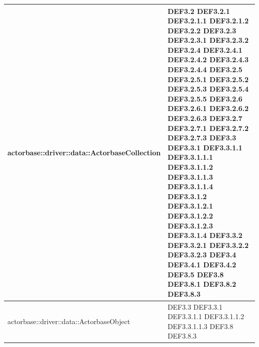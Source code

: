 \documentclass{scalatekids-article}
\begin{document}
\begin{longtable}[H]{|p{12cm}|p{5.5cm}|}
  actorbase::driver::data::ActorbaseCollection & \multiLineCell[t]{DEF3.2 DEF3.2.1\\DEF3.2.1.1 DEF3.2.1.2\\DEF3.2.2 DEF3.2.3\\DEF3.2.3.1 DEF3.2.3.2\\DEF3.2.4 DEF3.2.4.1\\DEF3.2.4.2 DEF3.2.4.3\\DEF3.2.4.4 DEF3.2.5\\DEF3.2.5.1 DEF3.2.5.2\\DEF3.2.5.3 DEF3.2.5.4\\DEF3.2.5.5 DEF3.2.6\\DEF3.2.6.1 DEF3.2.6.2\\DEF3.2.6.3 DEF3.2.7\\DEF3.2.7.1 DEF3.2.7.2\\DEF3.2.7.3 DEF3.3\\DEF3.3.1 DEF3.3.1.1\\DEF3.3.1.1.1 DEF3.3.1.1.2\\DEF3.3.1.1.3 DEF3.3.1.1.4\\DEF3.3.1.2 DEF3.3.1.2.1\\DEF3.3.1.2.2 DEF3.3.1.2.3\\DEF3.3.1.4 DEF3.3.2\\DEF3.3.2.1 DEF3.3.2.2\\DEF3.3.2.3 DEF3.4\\DEF3.4.1 DEF3.4.2\\DEF3.5 DEF3.8\\DEF3.8.1 DEF3.8.2\\DEF3.8.3}\\
  \hline
  actorbase::driver::data::ActorbaseObject & \multiLineCell[t]{DEF3.3 DEF3.3.1\\DEF3.3.1.1 DEF3.3.1.1.2\\DEF3.3.1.1.3 DEF3.8\\DEF3.8.3}\\
  \hline

\end{longtable}
\end{document}
